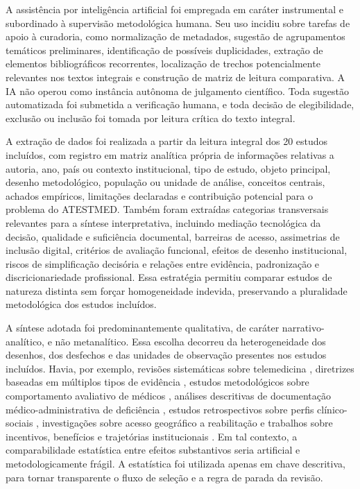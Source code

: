 \documentclass[12pt,a4paper]{article}
\begin{document}
A assistência por inteligência artificial foi empregada em caráter instrumental e subordinado à supervisão metodológica humana. Seu uso incidiu sobre tarefas de apoio à curadoria, como normalização de metadados, sugestão de agrupamentos temáticos preliminares, identificação de possíveis duplicidades, extração de elementos bibliográficos recorrentes, localização de trechos potencialmente relevantes nos textos integrais e construção de matriz de leitura comparativa. A IA não operou como instância autônoma de julgamento científico. Toda sugestão automatizada foi submetida a verificação humana, e toda decisão de elegibilidade, exclusão ou inclusão foi tomada por leitura crítica do texto integral.

A extração de dados foi realizada a partir da leitura integral dos 20 estudos incluídos, com registro em matriz analítica própria de informações relativas a autoria, ano, país ou contexto institucional, tipo de estudo, objeto principal, desenho metodológico, população ou unidade de análise, conceitos centrais, achados empíricos, limitações declaradas e contribuição potencial para o problema do ATESTMED. Também foram extraídas categorias transversais relevantes para a síntese interpretativa, incluindo mediação tecnológica da decisão, qualidade e suficiência documental, barreiras de acesso, assimetrias de inclusão digital, critérios de avaliação funcional, efeitos de desenho institucional, riscos de simplificação decisória e relações entre evidência, padronização e discricionariedade profissional. Essa estratégia permitiu comparar estudos de natureza distinta sem forçar homogeneidade indevida, preservando a pluralidade metodológica dos estudos incluídos.

A síntese adotada foi predominantemente qualitativa, de caráter narrativo-analítico, e não metanalítico. Essa escolha decorreu da heterogeneidade dos desenhos, dos desfechos e das unidades de observação presentes nos estudos incluídos. Havia, por exemplo, revisões sistemáticas sobre telemedicina \parencite{ftouni2022challengesoftelemedicineduringthecovid19pandemica}, diretrizes baseadas em múltiplos tipos de evidência \parencite{gabbay2011niceguidanceonlongtermsicknessandincapacity}, estudos metodológicos sobre comportamento avaliativo de médicos \parencite{steenbeek2011thedevelopmentofinstrumentstomeasuretheworkdisa}, análises descritivas de documentação médico-administrativa de deficiência \parencite{sa2020medicalcertificateofdisabilityadescriptiveanalysisofav}, estudos retrospectivos sobre perfis clínico-sociais \parencite{hospital2016mentaldisabilityaretrospectivestudyofsocioclinica}, investigações sobre acesso geográfico a reabilitação \parencite{gao2019disabilityconcentrationandaccesstorehabilitationservice} e trabalhos sobre incentivos, benefícios e trajetórias institucionais \parencite{corden2001incapacitybenefitsandworkincentives, sainsbury2006routesontoincapacitybenefitsfindingsfromqualitati}. Em tal contexto, a comparabilidade estatística entre efeitos substantivos seria artificial e metodologicamente frágil. A estatística foi utilizada apenas em chave descritiva, para tornar transparente o fluxo de seleção e a regra de parada da revisão.
\end{document}
